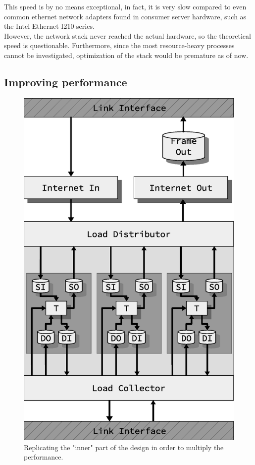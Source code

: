 This speed is by no means exceptional, in fact, it is very slow compared
to even common ethernet network adapters found in consumer server hardware, such
as the Intel Ethernet I210 series\cite{intel_1gbps_nic}.\\

However, the network stack never reached the actual hardware, so the
theoretical speed is questionable. Furthermore, since the most resource-heavy
processes cannot be investigated, optimization of the stack would be premature
as of now.




\subsection{Improving performance}


\begin{figure}
\centering
\includegraphics[width=\linewidth]{discussion/design_stacked.eps}
\caption{Replicating the "inner" part of the design in order to multiply the
performance. }
\label{fig:design_stacked}
\end{figure}


